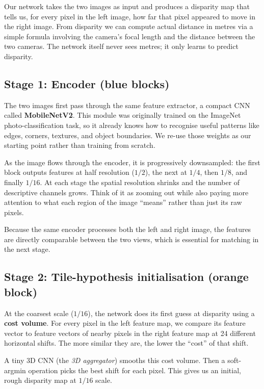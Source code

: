 \documentclass[11pt,a4paper]{article}
\begin{document}
Our network takes the two images as input and produces a disparity map
that tells us, for every pixel in the left image, how far that pixel
appeared to move in the right image. From disparity we can compute
actual distance in metres via a simple formula involving the camera's
focal length and the distance between the two cameras. The network
itself never sees metres; it only learns to predict disparity.

\subsection{Stage 1: Encoder (blue blocks)}

The two images first pass through the same feature extractor, a
compact CNN called \textbf{MobileNetV2}. This module was
originally trained on the ImageNet photo-classification task, so it
already knows how to recognise useful patterns like edges, corners,
textures, and object boundaries. We re-use those weights as our
starting point rather than training from scratch.

As the image flows through the encoder, it is progressively downsampled:
the first block outputs features at half resolution ($1/2$), the next at
$1/4$, then $1/8$, and finally $1/16$. At each stage the spatial
resolution shrinks and the number of descriptive channels grows. Think
of it as zooming out while also paying more attention to what each
region of the image ``means'' rather than just its raw pixels.

Because the same encoder processes both the left and right image, the
features are directly comparable between the two views, which is
essential for matching in the next stage.

\subsection{Stage 2: Tile-hypothesis initialisation (orange block)}

At the coarsest scale ($1/16$), the network does its first guess at
disparity using a \textbf{cost volume}. For every pixel in the left
feature map, we compare its feature vector to feature vectors of nearby
pixels in the right feature map at 24 different horizontal shifts. The
more similar they are, the lower the ``cost'' of that shift.

A tiny 3D CNN (the \emph{3D aggregator}) smooths this cost volume. Then
a soft-argmin operation picks the best shift for each pixel. This gives
us an initial, rough disparity map at $1/16$ scale.
\end{document}
